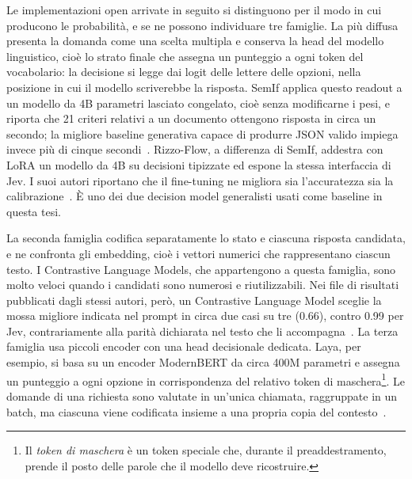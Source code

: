 Le implementazioni open arrivate in seguito si distinguono per il modo in cui producono le probabilità, e se ne possono
individuare tre famiglie. La più diffusa presenta la domanda come una scelta multipla e conserva la head del modello
linguistico, cioè lo strato finale che assegna un punteggio a ogni token del vocabolario: la decisione si legge dai
logit delle lettere delle opzioni, nella posizione in cui il modello scriverebbe la risposta. SemIf applica questo
readout a un modello da 4B parametri lasciato congelato, cioè senza modificarne i pesi, e riporta che 21 criteri relativi
a un documento ottengono risposta in circa un secondo; la migliore baseline generativa capace di produrre JSON valido
impiega invece più di cinque secondi~\cite{semif}. Rizzo-Flow, a differenza di SemIf, addestra con LoRA un modello da 4B
su decisioni tipizzate ed espone la stessa interfaccia di Jev. I suoi autori riportano che il fine-tuning ne migliora sia
l'accuratezza sia la calibrazione~\cite{rizzoflow}. È uno dei due decision model generalisti usati come baseline in questa tesi.

La seconda famiglia codifica separatamente lo stato e ciascuna risposta candidata, e ne confronta gli embedding, cioè i
vettori numerici che rappresentano ciascun testo. I Contrastive Language Models, che appartengono a questa famiglia, sono
molto veloci quando i candidati sono numerosi e riutilizzabili. Nei file di risultati pubblicati dagli stessi autori, però, un Contrastive Language Model sceglie la mossa migliore indicata nel prompt in circa due casi su tre (0.66), contro 0.99 per Jev, contrariamente alla parità dichiarata nel testo che li accompagna~\cite{kwok2026clm}. La terza famiglia usa piccoli encoder con una head decisionale dedicata. Laya, per esempio, si basa su un encoder ModernBERT da circa 400M parametri e assegna un punteggio a ogni opzione in corrispondenza del relativo token di maschera\footnote{Il \emph{token di maschera} è un token speciale che, durante il preaddestramento, prende il posto delle parole che il modello deve ricostruire.}. Le domande di una richiesta sono valutate in un'unica chiamata, raggruppate in un batch, ma ciascuna
viene codificata insieme a una propria copia del contesto~\cite{convai2026laya,azizi2026labels}.

